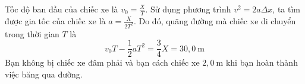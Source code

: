 \begin{solution}
    Tốc độ ban đầu của chiếc xe là \( v_0 = \frac{X}{T} \). Sử dụng phương trình \( v^2 = 2a\Delta x \), ta tìm được gia tốc của chiếc xe là \( a = \frac{X}{2T^2} \). Do đó, quãng đường mà chiếc xe di chuyển trong thời gian \( T \) là 
    \[
    v_0 T - \frac{1}{2} a T^2 = \frac{3}{4} X = 30,0 \ \text{m}
    \]
    Bạn không bị chiếc xe đâm phải và bạn cách chiếc xe \( \boxed{2,0 \ \text{m}} \) khi bạn hoàn thành việc băng qua đường.

\end{solution}